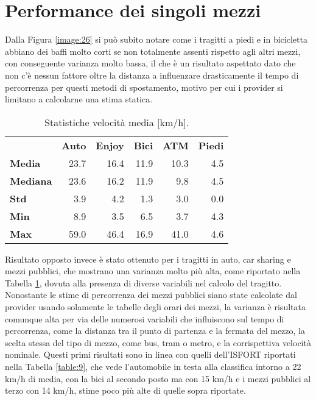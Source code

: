 \section{Performance dei singoli mezzi}

Dalla Figura  \ref{image:26} si può subito notare come i tragitti a piedi e in bicicletta abbiano dei baffi molto corti se non totalmente assenti rispetto agli altri mezzi, con conseguente varianza molto bassa, il che è un risultato aspettato dato che non c'è nessun fattore oltre la distanza a influenzare drasticamente il tempo di percorrenza per questi metodi di spostamento, motivo per cui i provider si limitano a calcolarne una stima statica.

\begin{table}
	\centering
	\begin{tabular}{ | l r r r r r | }
		\hline
		& \textbf{Auto} & \textbf{Enjoy} & \textbf{Bici} & \textbf{ATM} & \textbf{Piedi} \\
		\textbf{Media}      & 23.7 & 16.4 & 11.9 & 10.3 & 4.5 \\
		\textbf{Mediana} & 23.6 & 16.2 & 11.9 &   9.8 & 4.5 \\
		\textbf{Std}             &  3.9 &   4.2 &   1.3 &    3.0 & 0.0 \\
		\textbf{Min}            &  8.9 &   3.5 &   6.5 &    3.7 & 4.3 \\
		\textbf{Max}         & 59.0 & 46.4 & 16.9 &  41.0 & 4.6 \\
		\hline
	\end{tabular}
	\caption{Statistiche velocità media [km/h].}
	\label{table:3}
\end{table}

 Risultato opposto invece è stato ottenuto per i tragitti in auto, car sharing e mezzi pubblici, che mostrano una varianza molto più alta, come riportato nella Tabella \ref{table:3}, dovuta alla presenza di diverse variabili nel calcolo del tragitto. Nonostante le stime di percorrenza dei mezzi pubblici siano state calcolate dal provider usando solamente le tabelle degli orari dei mezzi, la varianza è risultata comunque alta per via delle numerosi variabili che influiscono sul tempo di percorrenza, come la distanza tra il punto di partenza e la fermata del mezzo, la scelta stessa del tipo di mezzo, come bus, tram o metro, e la corrispettiva velocità nominale. Questi primi risultati sono in linea con quelli dell'ISFORT riportati nella Tabella \ref{table:9}, che vede l'automobile in testa alla classifica intorno a 22 km/h di media, con la bici al secondo posto ma con 15 km/h e i mezzi pubblici al terzo con 14 km/h, stime poco più alte di quelle sopra riportate.

